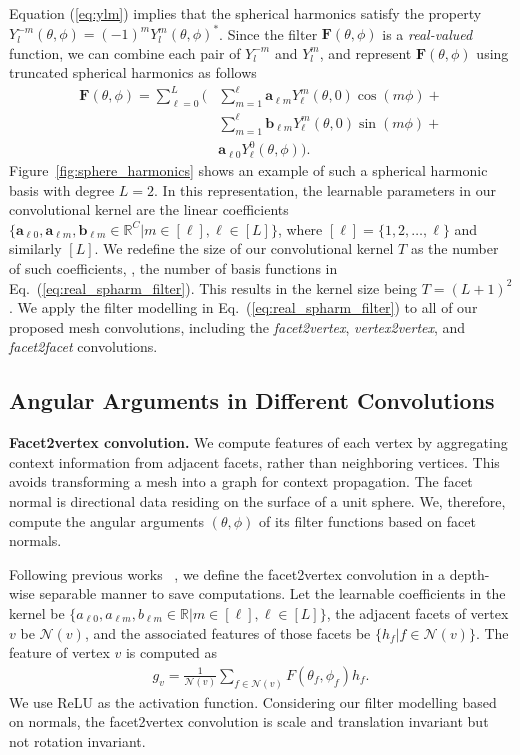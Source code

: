{Equation (\ref{eq:ylm}) implies that the spherical harmonics satisfy the property $Y_l^{-m}(\theta,\phi){=}(-1)^mY_l^m(\theta,\phi)^*$. Since the filter $\mathbf{F}(\theta,\phi)$ is a \textit{real-valued} function, we can combine each pair of $Y_l^{-m}$ and $Y_l^m$, and represent $\mathbf{F}(\theta,\phi)$ using truncated spherical harmonics as follows
\begin{equation}\label{eq:real_spharm_filter}
\begin{split}
\mathbf{F}(\theta,\phi)= \sum_{\ell=0}^{L}\Big( &\sum_{m=1}^{\ell}\mathbf{a}_{\ell m}Y_{\ell}^m(\theta,0)\cos(m\phi)+\\
&\sum_{m=1}^{\ell}\mathbf{b}_{\ell m}Y_{\ell}^m(\theta,0)\sin(m\phi)+\\
&\mathbf{a}_{\ell 0}Y_{\ell}^0(\theta,\phi)\Big).
\end{split}
\end{equation}
Figure~\ref{fig:sphere_harmonics} shows an example of such a spherical harmonic basis with degree $L{=}2$. In this representation, the learnable parameters in our convolutional kernel are the linear coefficients $\{\mathbf{a}_{\ell 0}, \mathbf{a}_{\ell m}, \mathbf{b}_{\ell m}{\in}\mathbb{R}^C|m{\in}[\ell], \ell{\in}[L]\}$, where $[\ell]{=}\{1,2,\dots,\ell\}$ and similarly $[L]$. We redefine the size of our convolutional kernel $T$ as the number of such coefficients, \ie, the number of basis functions in Eq.~(\ref{eq:real_spharm_filter}). This results in the kernel size being $T=(L+1)^2$.
We apply the filter modelling in Eq.~(\ref{eq:real_spharm_filter}) to all of our proposed mesh convolutions, including the \textit{facet2vertex}, \textit{vertex2vertex}, and \textit{facet2facet} convolutions. 

\subsection{Angular Arguments in Different Convolutions}
\noindent\textbf{Facet2vertex convolution.}  We compute features of each vertex by aggregating context information from adjacent facets, rather than neighboring vertices. This avoids transforming a mesh into a graph for context propagation.
The facet normal is directional data residing on the surface of a unit sphere. We, therefore, compute the angular arguments $(\theta,\phi)$ of its filter functions based on facet normals. 

Following previous works \eg~\cite{chollet2017xception,lei2020spherical}, we define the facet2vertex convolution in a depth-wise separable manner to save computations. Let the learnable coefficients in the kernel be $\{a_{\ell 0}, a_{\ell m}, b_{\ell m}{\in}\mathbb{R}|m{\in}[\ell], \ell{\in}[L]\}$, the adjacent facets of vertex $v$ be $\mathcal{N}(v)$, and the associated features of those facets be $\{h_f|{f\in\mathcal{N}(v)}\}$. The feature of vertex $v$ is computed as 
\begin{align}
g_v =\frac{1}{\mathcal{N}(v)}\sum_{f\in\mathcal{N}(v)}F(\theta_f, \phi_f){h_f}.
\label{eq:F2V_Conv}
\end{align}
We use ReLU \cite{nair2010rectified} as the activation function. Considering
our filter modelling based on normals, the facet2vertex convolution is scale and translation invariant but not rotation invariant.

}
